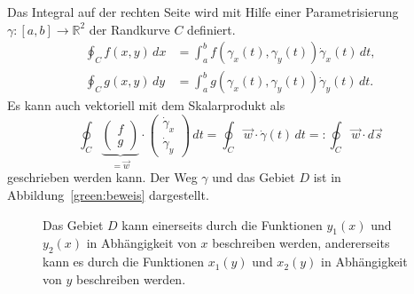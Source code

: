 Das Integral auf der rechten Seite wird mit Hilfe einer Parametrisierung
$\gamma\colon [a,b]\to\mathbb R^2$ der Randkurve $C$ definiert.
\begin{align*}
\oint_C f(x,y)\,dx
&=
\int_a^b f(\gamma_x(t),\gamma_y(t))\dot{\gamma}_x(t)\,dt,
\\
\oint_C g(x,y)\,dy
&=
\int_a^b g(\gamma_x(t),\gamma_y(t))\dot{\gamma}_y(t)\,dt.
\end{align*}
Es kann auch vektoriell mit dem Skalarprodukt als
\[
\oint_C
\underbrace{
\begin{pmatrix}f\\g\end{pmatrix}
}_{\displaystyle =\vec{w}}
\cdot
\begin{pmatrix}\dot\gamma_x\\\dot\gamma_y\end{pmatrix}
\,dt
=
\oint_C \vec{w}\cdot\dot\gamma(t)\,dt
=:
\oint_C \vec{w}\cdot d\vec{s}
\]
geschrieben werden kann.
Der Weg $\gamma$ und das Gebiet $D$ ist in Abbildung~\ref{green:beweis}
dargestellt.

\begin{figure}
\centering
{}
\caption{Das Gebiet $D$ kann einerseits durch die Funktionen
$y_1(x)$ und $y_2(x)$ in Abhängigkeit von $x$ beschreiben werden,
andererseits kann es durch die Funktionen
$x_1(y)$ und $x_2(y)$ in Abhängigkeit von $y$ beschreiben werden.
\label{green:zweiraender}}
\end{figure}


